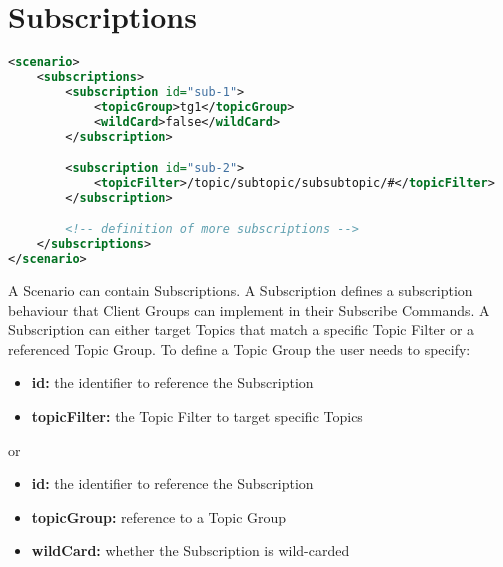\section{Subscriptions}
\begin{lstlisting}[caption={XMl definition of subscriptions}, captionpos=b, label={lst:subscriptions}, language=XML]
<scenario>
	<subscriptions>
		<subscription id="sub-1">
			<topicGroup>tg1</topicGroup>
			<wildCard>false</wildCard>
		</subscription>

		<subscription id="sub-2">
			<topicFilter>/topic/subtopic/subsubtopic/#</topicFilter>
		</subscription>

		<!-- definition of more subscriptions -->
	</subscriptions>
</scenario>
\end{lstlisting}
A Scenario can contain Subscriptions.
A Subscription defines a subscription behaviour that Client Groups can implement in their Subscribe Commands.
A Subscription can either target Topics that match a specific Topic Filter or a referenced Topic Group.
To define a Topic Group the user needs to specify:
\begin{itemize}
	\item \textbf{id:} the identifier to reference the Subscription
	\item \textbf{topicFilter:} the Topic Filter to target specific Topics
\end{itemize}
or
\begin{itemize}
	\item \textbf{id:} the identifier to reference the Subscription
	\item \textbf{topicGroup:} reference to a Topic Group
	\item \textbf{wildCard:} whether the Subscription is wild-carded 
\end{itemize}

